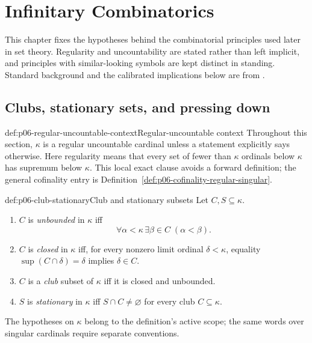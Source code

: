 
\chapter{Infinitary Combinatorics}
\label{sec:p06-infinitary-combinatorics}

This chapter fixes the hypotheses behind the combinatorial principles used
later in set theory.  Regularity and uncountability are stated rather than
left implicit, and principles with similar-looking symbols are kept distinct
in standing.  Standard background and the calibrated implications below are
from \cite{Jech2003,Kunen2011}.

\section{Clubs, stationary sets, and pressing down}
\label{sec:p06-club-stationary}

\begin{hbconvention}{def:p06-regular-uncountable-context}{Regular-uncountable context}
Throughout this section, \(\kappa\) is a regular uncountable cardinal unless
a statement explicitly says otherwise.  Here regularity means that every set
of fewer than \(\kappa\) ordinals below \(\kappa\) has supremum below
\(\kappa\).  This local exact clause avoids a forward definition; the general
cofinality entry is Definition~\ref{def:p06-cofinality-regular-singular}.
\end{hbconvention}

\begin{hbdefinition}{def:p06-club-stationary}{Club and stationary subsets}
Let \(C,S\subseteq\kappa\).
\begin{enumerate}
  \item \(C\) is \emph{unbounded} in \(\kappa\) iff
  \[
    \forall\alpha<\kappa\,\exists\beta\in C\;(\alpha<\beta).
  \]
  \item \(C\) is \emph{closed} in \(\kappa\) iff, for every nonzero limit
        ordinal \(\delta<\kappa\), equality
        \(\sup(C\cap\delta)=\delta\) implies \(\delta\in C\).
  \item \(C\) is a \emph{club} subset of \(\kappa\) iff it is closed and
        unbounded.
  \item \(S\) is \emph{stationary} in \(\kappa\) iff
        \(S\cap C\ne\varnothing\) for every club \(C\subseteq\kappa\).
\end{enumerate}
The hypotheses on \(\kappa\) belong to the definition's active scope; the
same words over singular cardinals require separate conventions.
\end{hbdefinition}

